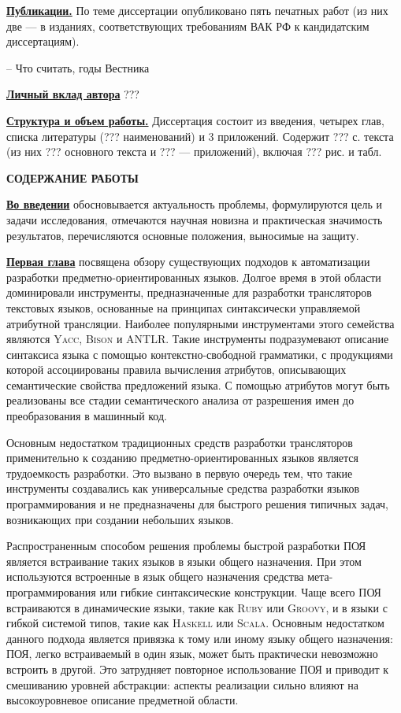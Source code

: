 \documentclass[12pt,a4paper]{article}
\newcommand{\tool}[1]{\textsc{#1}}
\newcommand{\afsection}[1]{\par \begin{center}\textbf{\MakeUppercase{#1}}\end{center}}
\newcommand{\afsubsection}[1]{\par \textbf{\underline{#1}}}
\begin{document}
\afsubsection{Публикации.} По теме диссертации опубликовано пять печатных работ (из них две --- в изданиях, соответствующих требованиям ВАК РФ к кандидатским диссертациям).

-- Что считать, годы Вестника

\afsubsection{Личный вклад автора}
???

\afsubsection{Структура и объем работы.} Диссертация состоит из введения, четырех глав, списка литературы (??? наименований) и 3 приложений. Содержит ??? с. текста (из них ??? основного текста и ??? --- приложений), включая ??? рис. и табл.

\afsection{Содержание работы}

\afsubsection{Во введении} обосновывается актуальность проблемы, формулируются цель и задачи исследования, отмечаются научная новизна и практическая значимость результатов, перечисляются основные положения, выносимые на защиту.

\afsubsection{Первая глава} посвящена обзору существующих подходов к автоматизации разработки предметно-ориентированных языков. Долгое время в этой области доминировали инструменты, предназначенные для разработки трансляторов текстовых языков, основанные на принципах синтаксически управляемой атрибутной трансляции. Наиболее популярными инструментами этого семейства являются \tool{Yacc}, \tool{Bison} и \tool{ANTLR}. Такие инструменты подразумевают описание синтаксиса языка с помощью контекстно-свободной грамматики, с продукциями которой ассоциированы правила вычисления атрибутов, описывающих семантические свойства предложений языка. С помощью атрибутов могут быть реализованы все стадии семантического анализа от разрешения имен до преобразования в машинный код. 

Основным недостатком традиционных средств разработки трансляторов применительно к созданию предметно-ориентированных языков является трудоемкость разработки. Это вызвано в первую очередь тем, что такие инструменты создавались как универсальные средства разработки языков программирования и не предназначены для быстрого решения типичных задач, возникающих при создании небольших языков.

Распространенным способом решения проблемы быстрой разработки ПОЯ является встраивание таких языков в языки общего назначения. При этом используются встроенные в язык общего назначения средства мета-программирования или гибкие синтаксические конструкции. Чаще всего ПОЯ встраиваются в динамические языки, такие как \tool{Ruby} или \tool{Groovy}, и в языки с гибкой системой типов, такие как \tool{Haskell} или \tool{Scala}. Основным недостатком данного подхода является привязка к тому или иному языку общего назначения: ПОЯ, легко встраиваемый в один язык, может быть практически невозможно встроить в другой. Это затрудняет повторное использование ПОЯ и приводит к смешиванию уровней абстракции: аспекты реализации сильно влияют на высокоуровневое описание предметной области.
\end{document}
